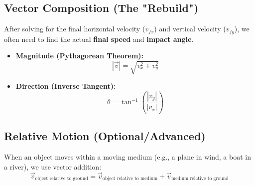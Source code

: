 \documentclass{article}
\begin{document}
\subsection{Vector Composition (The "Rebuild")}

\begin{center}
\end{center}
After solving for the final horizontal velocity ($v_{fx}$) and vertical velocity ($v_{fy}$), we often need to find the actual \textbf{final speed} and \textbf{impact angle}.

\begin{itemize}
  \item \textbf{Magnitude (Pythagorean Theorem):}
    \begin{equation}
      |\vec{v}| = \sqrt{v_x^2 + v_y^2}
    \end{equation}
  \item \textbf{Direction (Inverse Tangent):}
    \begin{equation}
      \theta = \tan^{-1} \left( \frac{|v_y|}{|v_x|} \right)
    \end{equation}
\end{itemize}

\subsection{Relative Motion (Optional/Advanced)}
When an object moves within a moving medium (e.g., a plane in wind, a boat in a river), we use vector addition:
\begin{equation}
  \vec{v}_{\text{object relative to ground}} = \vec{v}_{\text{object relative to medium}} + \vec{v}_{\text{medium relative to ground}}
\end{equation}
\end{document}

